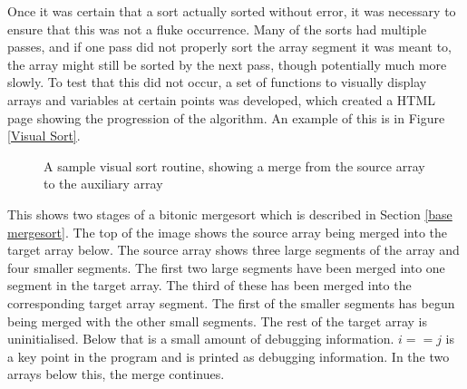 Once it was certain that a sort actually sorted without error, it was necessary
to ensure that this was not a fluke occurrence. Many of the sorts had multiple
passes, and if one pass did not properly sort the array segment it was meant to,
the array might still be sorted by the next pass, though potentially much more
slowly. To test that this did not occur, a set of functions to visually display
arrays and variables at certain points was developed, which created a HTML page
showing the progression of the algorithm. An example of this is in Figure
\vref{Visual Sort}.

\begin{figure}
\caption{A sample visual sort routine, showing a merge from the source array to
the auxiliary array}
\label{Visual Sort}
\end{figure}

This shows two stages of a bitonic mergesort which is described in Section \ref{base
mergesort}. The top of the image shows the source array being merged into the
target array below. The source array shows three large segments of the array and
four smaller segments. The first two large segments have been merged into one
segment in the target array. The third of these has been merged into the
corresponding target array segment. The first of the smaller segments has begun
being merged with the other small segments. The rest of the target array is
uninitialised.  Below that is a small amount of debugging information. $i == j$
is a key point in the program and is printed as debugging information. In the
two arrays below this, the merge continues.

